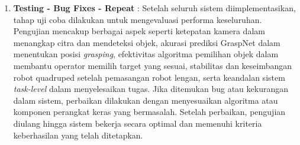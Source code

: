 \begin{enumerate}
  \item \textbf{Testing - Bug Fixes - Repeat} : Setelah seluruh sistem diimplementasikan, tahap uji coba dilakukan
  untuk mengevaluasi performa keseluruhan. Pengujian mencakup berbagai aspek seperti ketepatan kamera dalam menangkap
  citra dan mendeteksi objek, akurasi prediksi GraspNet dalam menentukan posisi \emph{grasping}, efektivitas algoritma
  pemilihan objek dalam membantu operator memilih target yang sesuai, stabilitas dan keseimbangan robot quadruped setelah
  pemasangan robot lengan, serta keandalan sistem \emph{task-level} dalam menyelesaikan tugas. Jika ditemukan bug atau
  kekurangan dalam sistem, perbaikan dilakukan dengan menyesuaikan algoritma atau komponen perangkat keras yang bermasalah.
  Setelah perbaikan, pengujian diulang hingga sistem bekerja secara optimal dan memenuhi kriteria keberhasilan yang telah ditetapkan.
  
\end{enumerate}